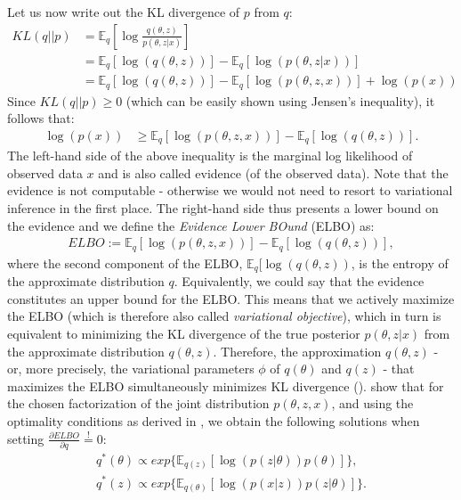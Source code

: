 Let us now write out the KL divergence of $p$ from $q$:
\begin{align*}
KL(q||p) &= \mathbb{E}_q[\log\frac{q(\theta,z)}{p(\theta,z|x)}] \\
&= \mathbb{E}_q[\log(q(\theta,z))] - \mathbb{E}_q[\log(p(\theta,z|x))] \\
&=\mathbb{E}_q[\log(q(\theta,z))] - \mathbb{E}_q[\log(p(\theta,z,x))] + \log(p(x)) 
\end{align*}
Since $KL(q||p) \geq 0$ (which can be easily shown using Jensen's inequality), it follows that:
\begin{align*}
\log(p(x)) & \geq \mathbb{E}_q[\log(p(\theta,z,x))] - \mathbb{E}_q[\log(q(\theta,z))].
\end{align*}
The left-hand side of the above inequality is the marginal log likelihood of observed data $x$ and is also called evidence (of the observed data). Note that the evidence is not computable - otherwise we would not need to resort to variational inference in the first place. The right-hand side thus presents a lower bound on the evidence and we define the \textit{Evidence Lower BOund} (ELBO) as:
\begin{align*}
ELBO := \mathbb{E}_q[\log(p(\theta,z,x))] - \mathbb{E}_q[\log(q(\theta,z))],
\end{align*}
where the second component of the ELBO, $\mathbb{E}_q[\log(q(\theta,z))$, is the entropy of the approximate distribution $q$. Equivalently, we could say that the evidence constitutes an upper bound for the ELBO. This means that we actively maximize the ELBO (which is therefore also called \textit{variational objective}), which in turn is equivalent to minimizing the KL divergence of the true posterior $p(\theta,z|x)$ from the approximate distribution $q(\theta,z)$. Therefore, the approximation $q(\theta,z)$ - or, more precisely, the variational parameters $\phi$ of $q(\theta)$ and $q(z)$ - that maximizes the ELBO simultaneously minimizes KL divergence (\citealp{blei2003latent, wang2013variational}). \cite{wang2013variational} show that for the chosen factorization of the joint distribution $p(\theta,z,x)$, and using the optimality conditions as derived in \cite{bishop2006pattern}, we obtain the following solutions when setting $\frac{\partial ELBO}{\partial q}\overset{!}{=}0$:
\begin{align*}
q^{*}(\theta) \propto exp\{\mathbb{E}_{q(z)}[\log(p(z|\theta))p(\theta)]\}, \\
q^{*}(z) \propto exp\{\mathbb{E}_{q(\theta)}[\log(p(x|z))p(z|\theta)]\}.
\end{align*}
